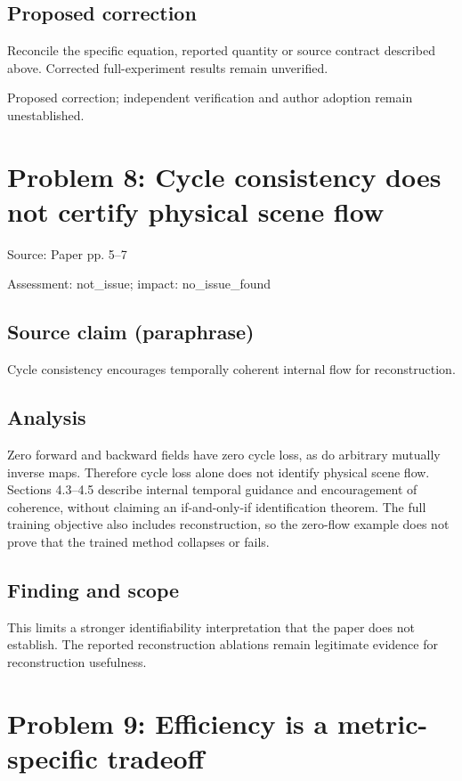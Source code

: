 \documentclass[11pt]{article}
\begin{document}
\subsection*{Proposed correction}

Reconcile the specific equation, reported quantity or source contract described above. Corrected full-experiment results remain unverified.

Proposed correction; independent verification and author adoption remain unestablished.

\section*{Problem 8: Cycle consistency does not certify physical scene flow}

Source: Paper pp. 5–7

Assessment: not\_issue; impact: no\_issue\_found

\subsection*{Source claim (paraphrase)}

Cycle consistency encourages temporally coherent internal flow for reconstruction.

\subsection*{Analysis}

Zero forward and backward fields have zero cycle loss, as do arbitrary mutually inverse maps. Therefore cycle loss alone does not identify physical scene flow. Sections 4.3–4.5 describe internal temporal guidance and encouragement of coherence, without claiming an if-and-only-if identification theorem. The full training objective also includes reconstruction, so the zero-flow example does not prove that the trained method collapses or fails.

\subsection*{Finding and scope}

This limits a stronger identifiability interpretation that the paper does not establish. The reported reconstruction ablations remain legitimate evidence for reconstruction usefulness.

\section*{Problem 9: Efficiency is a metric-specific tradeoff}
\end{document}

